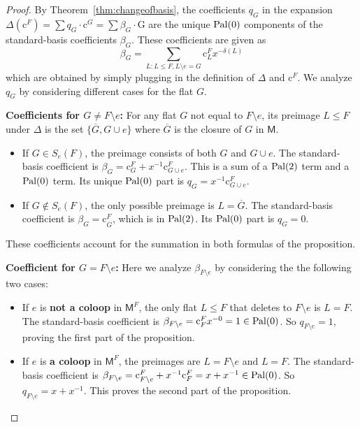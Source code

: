\documentclass[12pt,letterpaper,english]{amsart}
\theoremstyle{teoremas}
\theoremstyle{definition}
\newcommand{\M}{\mathsf{M}}
\newcommand{\Ebasis}[1]{\mathrm{#1}}
\newcommand{\Cbasis}[1]{\mathrm{c}^{#1}}
\newcommand{\CbasisSub}[2]{\mathrm{c}^{#1}_{#2}}
\newcommand{\pal}{\normalfont\text{Pal}}
\begin{document}
\begin{proof}
    By Theorem~\ref{thm:changeofbasis}, the coefficients
    \(q_G\) in the expansion \(\Delta(\Cbasis{F}) = \sum q_G \cdot \Cbasis{G}
    = \sum \beta_G \cdot \Ebasis{G}\) are the unique \(\pal(0)\)
    components of the standard-basis coefficients \(\beta_G\). These coefficients are given as
    \[\beta_G = \sum_{L: L \le F, L\setminus e = G} \CbasisSub{F}{L} x^{-\delta(L)}\]
    which are obtained by simply plugging in the definition of \(\Delta\) and \(\Cbasis{F}\).
    We analyze \(q_G\) by considering different cases for the flat \(G\).

    \textbf{Coefficients for \(G \neq F \setminus e\):}
    For any flat \(G\) not equal to \(F \setminus e\), its preimage \(L \le F\)
    under \(\Delta\) is the set \(\{\overline{G}, G \cup e\}\)
    where \(\overline{G}\) is the closure of \(G\) in \(\M\).
    \begin{itemize}
        \item If \(G \in S_e(F)\), the preimage consists of both \(G\) and \(G \cup e\).
        The standard-basis coefficient is \(\beta_G = \CbasisSub{F}{G} + x^{-1}\CbasisSub{F}{G\cup e}\).
        This is a sum of a \(\pal(2)\) term and a \(\pal(0)\) term. Its unique \(\pal(0)\) part is \(q_G = x^{-1}\CbasisSub{F}{G\cup e}\).
        \item If \(G \notin S_e(F)\), the only possible preimage is
              \(L=\overline{G}\). The standard-basis coefficient is
              \(\beta_G = \CbasisSub{F}{\overline{G}}\), which is in \(\pal(2)\). Its \(\pal(0)\) part is \(q_G = 0\).
    \end{itemize}
    These coefficients account for the summation in both formulas of the proposition.

    \textbf{Coefficient for \(G = F \setminus e\):}
    Here we analyze \(\beta_{F\setminus e}\) by considering the the following two cases:
    \begin{itemize}
        \item If \(e\) is \textbf{not a coloop} in \(\M^F\), the only flat \(L \le F\) that deletes to
              \(F \setminus e\) is \(L=F\). The standard-basis coefficient is \(\beta_{F\setminus e} =
              \CbasisSub{F}{F}x^{-0} = 1 \in \pal(0)\).
              So \(q_{F\setminus e} = 1\), proving the first part of the proposition.

        \item If \(e\) is \textbf{a coloop} in \(\M^F\), the preimages are \(L=F \setminus e\) and
              \(L=F\). The standard-basis coefficient is
              \(\beta_{F\setminus e} = \CbasisSub{F}{F\setminus e} + x^{-1}\CbasisSub{F}{F} = x+x^{-1}\in \pal(0)\).
              So \(q_{F\setminus e} = x+x^{-1}\). This proves the second part of the proposition.
    \end{itemize}
\end{proof}



\end{document}
